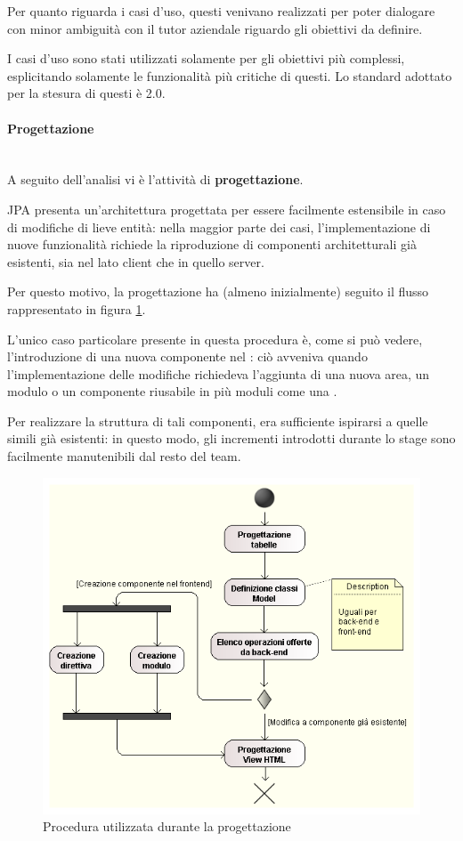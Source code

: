 Per quanto riguarda i casi d'uso, questi venivano realizzati per poter
dialogare con minor ambiguità con il tutor aziendale riguardo gli obiettivi da
definire.

I casi d'uso sono stati utilizzati solamente per gli obiettivi più complessi,
esplicitando solamente le funzionalità più critiche di questi. Lo standard
adottato per la stesura di questi è  2.0.

\paragraph{Progettazione} \mbox{} \\

A seguito dell'analisi vi è l'attività di \textbf{progettazione}.

JPA presenta un'architettura progettata per essere facilmente estensibile in
caso di modifiche di lieve entità: nella maggior parte dei casi,
l'implementazione di nuove funzionalità richiede la riproduzione di componenti
architetturali già esistenti, sia nel lato client che in quello server.

Per questo motivo, la progettazione ha (almeno inizialmente) seguito il flusso
rappresentato in figura \ref{fig:progettazione}.

L'unico caso particolare presente in questa procedura è, come si può vedere,
l'introduzione di una nuova componente nel \FREND{}: ciò avveniva quando
l'implementazione delle modifiche richiedeva l'aggiunta di una nuova area, un
modulo o un componente riusabile in più moduli come una .

Per realizzare la struttura di tali componenti, era sufficiente ispirarsi a
quelle simili già esistenti: in questo modo, gli incrementi introdotti durante
lo stage sono facilmente manutenibili dal resto del team.

\begin{figure}%
\centering
\includegraphics[width=.8\columnwidth]{immagini/progettazione}
\caption{Procedura utilizzata durante la progettazione}
\label{fig:progettazione}%
\end{figure}

